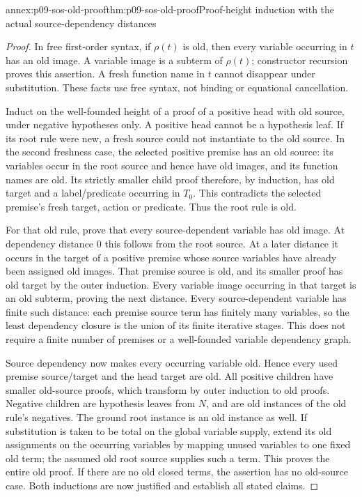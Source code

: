 \begin{annexitem}{annex:p09-sos-old-proof}{thm:p09-sos-old-proof}{Proof-height induction with the actual source-dependency distances}
\begin{proof}
In free first-order syntax, if \(\rho(t)\) is old, then every
variable occurring in \(t\) has an old image. A variable image
is a subterm of \(\rho(t)\); constructor recursion proves this
assertion. A fresh function name in \(t\) cannot disappear
under substitution. These facts use free syntax, not binding or
equational cancellation.

Induct on the well-founded height of a proof of a positive head
with old source, under negative hypotheses only. A positive head
cannot be a hypothesis leaf. If its root rule were new, a fresh
source could not instantiate to the old source. In the second
freshness case, the selected positive premise has an old source:
its variables occur in the root source and hence have old images,
and its function names are old. Its strictly smaller child proof
therefore, by induction, has old target and a label/predicate
occurring in \(T_0\). This contradicts the selected premise's
fresh target, action or predicate. Thus the root rule is old.

For that old rule, prove that every source-dependent variable has
old image. At dependency distance 0 this follows from the root
source. At a later distance it occurs in the target of a positive
premise whose source variables have already been assigned old
images. That premise source is old, and its smaller proof has
old target by the outer induction. Every variable image occurring
in that target is an old subterm, proving the next distance.
Every source-dependent variable has finite such distance: each
premise source term has finitely many variables, so the least
dependency closure is the union of its finite iterative stages.
This does not require a finite number of premises or a well-founded
variable dependency graph.

Source dependency now makes every occurring variable old. Hence
every used premise source/target and the head target are old.
All positive children have smaller old-source proofs, which transform
by outer induction to old proofs. Negative children are hypothesis
leaves from \(N\), and are old instances of the old rule's negatives.
The ground root instance is an old instance as well. If substitution
is taken to be total on the global variable supply, extend its
old assignments on the occurring variables by mapping unused
variables to one fixed old term; the assumed old root source
supplies such a term. This proves the entire old proof. If there
are no old closed terms, the assertion has no old-source case.
Both inductions are now justified and establish all stated claims.
\end{proof}
\end{annexitem}

